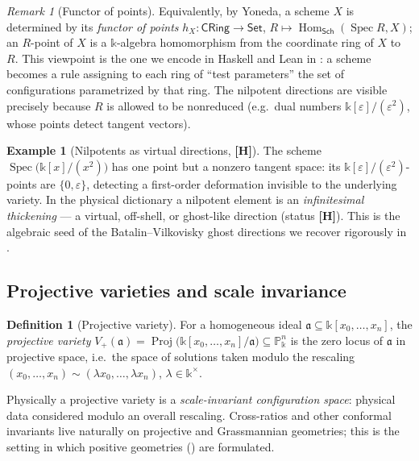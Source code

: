 \documentclass[12pt]{article}
\theoremstyle{definition}
\newtheorem{definition}[theorem]{Definition}
\newtheorem{example}[theorem]{Example}
\theoremstyle{remark}
\newtheorem{remark}[theorem]{Remark}
\newcommand{\Spec}{\operatorname{Spec}}
\newcommand{\Proj}{\operatorname{Proj}}
\newcommand{\Sch}{\mathsf{Sch}}
\newcommand{\Set}{\mathsf{Set}}
\newcommand{\CRing}{\mathsf{CRing}}
\newcommand{\Ideal}{\mathfrak{a}}
\newcommand{\PP}{\mathbb{P}}
\newcommand{\Hom}{\operatorname{Hom}}
\newcommand{\coeff}{\mathbb{k}}
\newcommand{\status}[1]{\textnormal{\textsf{\textbf{[#1]}}}}
\begin{document}
\begin{remark}[Functor of points]
\label{rem:fop}
Equivalently, by Yoneda, a scheme $X$ is determined by its \emph{functor of points}
$h_X\colon \CRing\to\Set$, $R\mapsto \Hom_{\Sch}(\Spec R, X)$; an $R$-point of $X$ is a
$\coeff$-algebra homomorphism from the coordinate ring of $X$ to $R$. This viewpoint is the one we
encode in \textsf{Haskell} and \textsf{Lean} in : a scheme becomes a rule assigning to
each ring of ``test parameters'' the set of configurations parametrized by that ring. The nilpotent
directions are visible precisely because $R$ is allowed to be nonreduced (e.g.\ dual numbers
$\coeff[\varepsilon]/(\varepsilon^2)$, whose points detect tangent vectors).
\end{remark}

\begin{example}[Nilpotents as virtual directions, \status{H}]
The scheme $\Spec\bigl(\coeff[x]/(x^2)\bigr)$ has one point but a nonzero tangent space: its
$\coeff[\varepsilon]/(\varepsilon^2)$-points are $\{0,\varepsilon\}$, detecting a first-order
deformation invisible to the underlying variety. In the physical dictionary a nilpotent element is an
\emph{infinitesimal thickening} --- a virtual, off-shell, or ghost-like direction (status \status{H}).
This is the algebraic seed of the Batalin--Vilkovisky ghost directions we recover rigorously in
.
\end{example}

\subsection{Projective varieties and scale invariance}

\begin{definition}[Projective variety]
For a homogeneous ideal $\Ideal\subseteq \coeff[x_0,\dots,x_n]$, the \emph{projective variety}
$V_+(\Ideal)=\Proj\bigl(\coeff[x_0,\dots,x_n]/\Ideal\bigr)\subseteq \PP^n_\coeff$ is the zero locus of
$\Ideal$ in projective space, i.e.\ the space of solutions taken modulo the rescaling
$(x_0,\dots,x_n)\sim (\lambda x_0,\dots,\lambda x_n)$, $\lambda\in\coeff^\times$.
\end{definition}

Physically a projective variety is a \emph{scale-invariant configuration space}: physical data
considered modulo an overall rescaling. Cross-ratios and other conformal invariants live naturally on
projective and Grassmannian geometries; this is the setting in which positive geometries
() are formulated.
\end{document}
